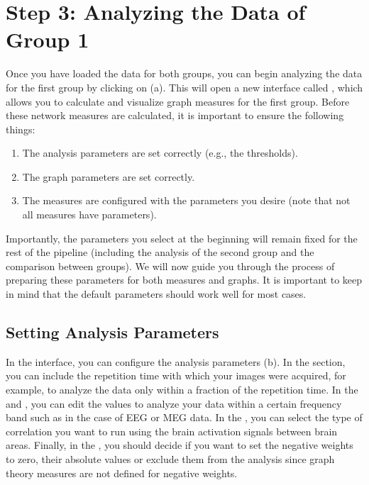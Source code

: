 \documentclass[justified]{tufte-handout}
\begin{document}
\clearpage
\section{Step 3: Analyzing the Data of Group 1}

Once you have loaded the data for both groups, you can begin analyzing the data for the first group by clicking on  (a). 
This will open a new interface called , which allows you to calculate and visualize graph measures for the first group. 
Before these network measures are calculated, it is important to ensure the following things: 
\begin{enumerate}
	\item The analysis parameters are set correctly (e.g., the thresholds).
	\item The graph parameters are set correctly.
	\item The measures are configured with the parameters you desire (note that not all measures have parameters).
\end{enumerate}

Importantly, the parameters you select at the beginning will remain fixed for the rest of the pipeline (including the analysis of the second group and the comparison between groups). We will now guide you through the process of preparing these parameters for both measures and graphs. It is important to keep in mind that the default parameters should work well for most cases.

\subsection{Setting Analysis Parameters}

In the  interface, you can configure the analysis parameters (b).
In the  section, you can include the repetition time with which your images were acquired, for example, to analyze the data only within a fraction of the repetition time.
In the  and , you can edit the values to analyze your data within a certain frequency band such as in the case of EEG or MEG data.
In the , you can select the type of correlation you want to run using the brain activation signals between brain areas. 
Finally, in the , you should decide if you want to set the negative weights to zero, their absolute values or exclude them from the analysis since graph theory measures are not defined for negative weights.
\end{document}
